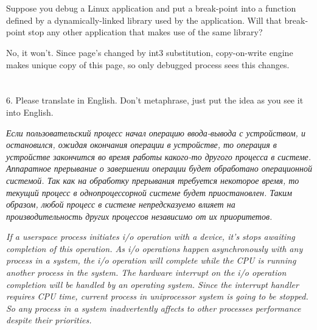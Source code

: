 \documentclass[a4paper,12pt]{article}
\begin{document}
\section{}
Suppose you debug a Linux application and put a break-point into a function defined by a dynamically-linked library used by the application. Will that break-point stop any other application that makes use of the same library?

\noindent\makebox[\linewidth]{\rule{\textwidth}{0.4pt}}

No, it won't.
Since page's changed by int3 substitution, copy-on-write engine makes unique copy of this page, so only debugged process sees this changes.

\section*{}
6. Please translate in English. Don’t metaphrase, just put the idea as you see it into English.
\noindent
\begin{displayquote}
\textit{
Если пользовательский процесс начал операцию ввода-вывода с устройством, и остановился, ожидая окончания операции в устройстве, то операция в устройстве закончится во время работы какого-то другого процесса в системе. Аппаратное прерывание о завершении операции будет обработано операционной системой. Так как на обработку прерывания требуется некоторое время, то текущий процесс в однопроцессорной системе будет приостановлен. Таким образом, любой процесс в системе непредсказуемо влияет на производительность других процессов независимо от их приоритетов.
}
\end{displayquote}

\begin{displayquote}
\textit{
If a userspace process initiates i/o operation with a device, it's stops awaiting completion of this operation. As i/o operations happen asynchronously with any process in a system, the i/o operation will complete while the CPU is running another process in the system. The hardware interrupt on the i/o operation completion will be handled by an operating system. Since the interrupt handler requires CPU time, current
process in uniprocessor system is going to be stopped. So any process in a system inadvertently affects to other processes performance despite their priorities.
}
\end{displayquote}
\end{document}

